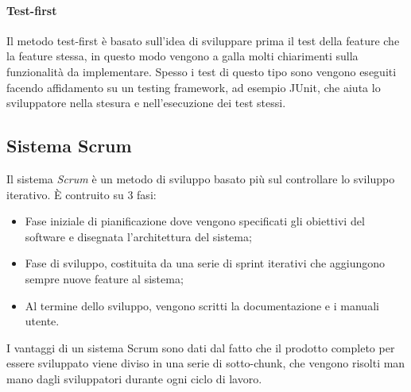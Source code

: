 \documentclass[a4paper, 10pt]{article}
\begin{document}
		\paragraph{Test-first} Il metodo test-first è basato sull'idea di sviluppare prima il test della feature che la feature stessa, in questo modo vengono a galla molti chiarimenti sulla funzionalità da implementare. Spesso i test di questo tipo sono vengono eseguiti facendo affidamento su un testing framework, ad esempio JUnit, che aiuta lo sviluppatore nella stesura e nell'esecuzione dei test stessi.
		
		\subsection*{Sistema Scrum}
		Il sistema \textit{Scrum} è un metodo di sviluppo basato più sul controllare lo sviluppo iterativo. È contruito su 3 fasi:
		\begin{itemize}
			\item Fase iniziale di pianificazione dove vengono specificati gli obiettivi del software e disegnata l'architettura del sistema;
			\item Fase di sviluppo, costituita da una serie di sprint iterativi che aggiungono sempre nuove feature al sistema;
			
			\item Al termine dello sviluppo, vengono scritti la documentazione e i manuali utente.
		\end{itemize}
		I vantaggi di un sistema Scrum sono dati dal fatto che il prodotto completo per essere sviluppato viene diviso in una serie di sotto-chunk, che vengono risolti man mano dagli sviluppatori durante ogni ciclo di lavoro.
		
\end{document}
